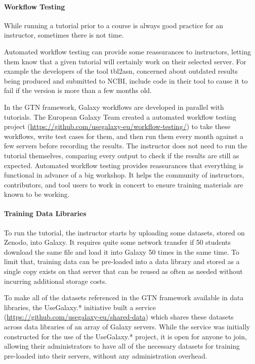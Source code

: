 \documentclass[10pt,letterpaper]{article}
\begin{document}
\paragraph*{Workflow Testing}
While running a tutorial prior to a course is always good practice for an instructor, sometimes there is not time. 

Automated workflow testing can provide some reassurances to instructors, letting them know that a given tutorial will certainly work on their selected server.
For example the developers of the tool tbl2asn, concerned about outdated results being produced and submitted to NCBI, include code in their tool to cause it to fail if the version is more than a few months old.

In the GTN framework, Galaxy workflows are developed in parallel with tutorials. The European Galaxy Team created a automated workflow testing project (\url{https://github.com/usegalaxy-eu/workflow-testing/}) to take these workflows, write test cases for them, and then run them every month against a few servers before recording the results. The instructor does not need to run the tutorial themselves, comparing every output to check if the results are still as expected. Automated workflow testing provides reassurances that everything is functional in advance of a big workshop. It helps the community of instructors, contributors, and tool users to work in concert to ensure training materials are known to be working.

\paragraph*{Training Data Libraries}

To run the tutorial, the instructor starts by uploading some datasets, stored on Zenodo, into Galaxy. It requires quite some network transfer if 50 students download the same file and load it into Galaxy 50 times in the same time. To limit that, training data can be pre-loaded into a data library and stored as a single copy exists on that server that can be reused as often as needed without incurring additional storage costs.

To make all of the datasets referenced in the GTN framework available in data libraries, the UseGalaxy.* initiative built a service (\url{https://github.com/usegalaxy-eu/shared-data}) which shares these datasets across data libraries of an array of Galaxy servers. While the service was initially constructed for the use of the UseGalaxy.* project, it is open for anyone to join, allowing their administrators to have all of the necessary datasets for training pre-loaded into their servers, without any administration overhead.
\end{document}
